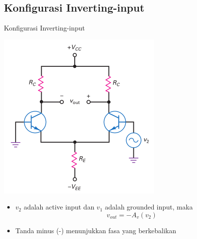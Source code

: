 \documentclass[aspectratio=169]{beamer}
\begin{document}
\subsection{Konfigurasi Inverting-input}
\begin{frame}{Konfigurasi Inverting-input}
	\begin{multicols}{2}
		\begin{center}
			\includegraphics[height=0.7\textheight]{gambar/01.inverting_input+differential_output}
		\end{center}
		\columnbreak
		\begin{itemize}
			\item $ v_2 $ adalah active input dan $ v_1 $ adalah grounded input, maka
			\begin{equation} \label{pers.4}
				v_{out} = -A_v(v_2)
			\end{equation}
			\item Tanda minus (-) menunjukkan fasa yang berkebalikan
		\end{itemize}
	\end{multicols}
\end{frame}
\end{document}
